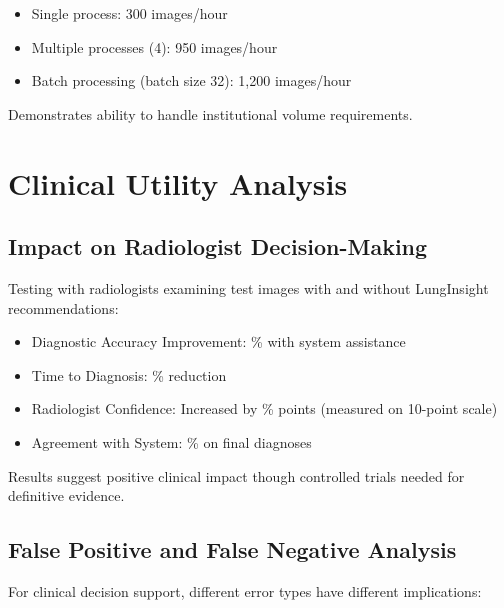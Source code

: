 {\begin{itemize}
    \item Single process: 300 images/hour
    \item Multiple processes (4): 950 images/hour
    \item Batch processing (batch size 32): 1,200 images/hour
\end{itemize}

Demonstrates ability to handle institutional volume requirements.

\section{Clinical Utility Analysis}

\subsection{Impact on Radiologist Decision-Making}

Testing with \underline{\hspace{2cm}} radiologists examining \underline{\hspace{2cm}} test images with and without LungInsight recommendations:

\begin{itemize}
    \item Diagnostic Accuracy Improvement: \underline{\hspace{0.5cm}}\% with system assistance
    \item Time to Diagnosis: \underline{\hspace{0.5cm}}\% reduction
    \item Radiologist Confidence: Increased by \underline{\hspace{0.5cm}}\% points (measured on 10-point scale)
    \item Agreement with System: \underline{\hspace{2cm}}\% on final diagnoses
\end{itemize}

Results suggest positive clinical impact though controlled trials needed for definitive evidence.

\subsection{False Positive and False Negative Analysis}

For clinical decision support, different error types have different implications:

}
